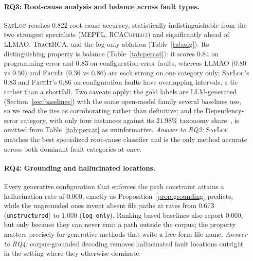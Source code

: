 \documentclass[runningheads]{llncs}
\begin{document}
\paragraph{RQ3: Root-cause analysis and balance across fault types.} \textsc{SafLoc} reaches $0.822$ root-cause accuracy, statistically indistinguishable from the two strongest specialists (\textsc{MEPFL}, \textsc{RCACopilot}) and significantly ahead of \textsc{LLMAO}, \textsc{TraceRCA}, and the log-only ablation (Table~\ref{tab:sig}). Its distinguishing property is balance (Table~\ref{tab:percat}): it scores $0.84$ on programming-error and $0.83$ on configuration-error faults, whereas \textsc{LLMAO} ($0.80$ vs $0.50$) and \textsc{FaceIt} ($0.36$ vs $0.86$) are each strong on one category only; \textsc{SafLoc}'s $0.83$ and \textsc{FaceIt}'s $0.86$ on configuration faults have overlapping intervals, a tie rather than a shortfall. Two caveats apply: the gold labels are LLM-generated (Section~\ref{sec:baselines}) with the same open-model family several baselines use, so we read the ties as corroborating rather than definitive; and the Dependency-error category, with only four instances against its $21.98\%$ taxonomy share~\cite{xie2025understanding}, is omitted from Table~\ref{tab:percat} as uninformative. \emph{Answer to RQ3:} \textsc{SafLoc} matches the best specialized root-cause classifier and is the only method accurate across both dominant fault categories at once.

\paragraph{RQ4: Grounding and hallucinated locations.} Every generative configuration that enforces the path constraint attains a hallucination rate of $0.000$, exactly as Proposition~\ref{prop:grounding} predicts, while the ungrounded ones invent absent file paths at rates from $0.673$ (\texttt{unstructured}) to $1.000$ (\texttt{log\_only}). Ranking-based baselines also report $0.000$, but only because they can never emit a path outside the corpus; the property matters precisely for generative methods that write a free-form file name. \emph{Answer to RQ4:} corpus-grounded decoding removes hallucinated fault locations outright in the setting where they otherwise dominate.
\end{document}

